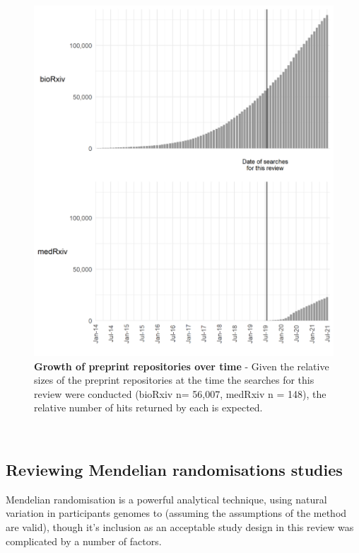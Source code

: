 \documentclass[a4paper, twoside]{templates/ociamthesis}
\begin{document}
\begin{figure}[H]
\includegraphics[width=1\linewidth]{figures/sys-rev/preprint_growth} \caption[Growth of preprint repositories over time]{\textbf{Growth of preprint repositories over time} - Given the relative sizes of the preprint repositories at the time the searches for this review were conducted (bioRxiv n= 56,007, medRxiv n = 148), the relative number of hits returned by each is expected.}\label{fig:preprintGrowth}
\end{figure}

~

\hypertarget{rev-discussion-MR}{%
\subsection{Reviewing Mendelian randomisations studies}\label{rev-discussion-MR}}

Mendelian randomisation is a powerful analytical technique, using natural variation in participants genomes to (assuming the assumptions of the method are valid), though it's inclusion as an acceptable study design in this review was complicated by a number of factors.
\end{document}
